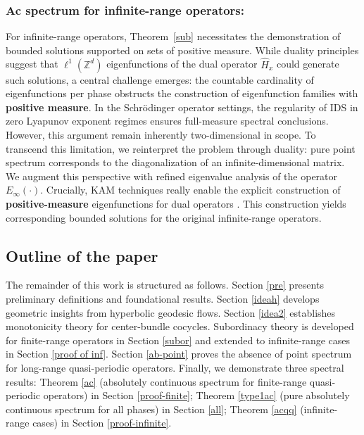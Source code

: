 \documentclass[11pt]{amsart}
\theoremstyle{remark}
\theoremstyle{definition}
\begin{document}
\subsubsection{Ac spectrum for infinite-range operators:}
For infinite-range operators, Theorem~\ref{sub} necessitates the demonstration of bounded solutions supported on sets of positive measure. While duality principles suggest that $\ell^1(\mathbb{Z}^d)$ eigenfunctions of the dual operator $\widehat{H}_x$ could generate such solutions, a central challenge emerges: the countable cardinality of eigenfunctions per phase obstructs the construction of eigenfunction families with \textbf{positive measure}.  
In the Schr\"odinger operator settings, the regularity of IDS in zero Lyapunov exponent regimes \cite{DeS, Puig1} ensures full-measure spectral conclusions. However, this argument remain inherently two-dimensional in scope. To transcend this limitation, we reinterpret the problem through duality: pure point spectrum corresponds to the diagonalization of an infinite-dimensional matrix. We augment this perspective with refined eigenvalue analysis of the operator \( E_\infty(\cdot ) \).  Crucially, KAM techniques really enable the explicit construction of \textbf{positive-measure} eigenfunctions for dual operators  \cite{E}. This construction yields corresponding bounded solutions for the original infinite-range operators. 



\subsection{Outline of the paper}
 

The remainder of this work is structured as follows. Section \ref{pre} presents preliminary definitions and foundational results. Section \ref{ideah} develops geometric insights from hyperbolic geodesic flows. Section \ref{idea2} establishes monotonicity theory for center-bundle cocycles. Subordinacy theory is developed for finite-range operators in Section \ref{subor} and extended to infinite-range cases in Section \ref{proof of inf}. Section \ref{ab-point} proves the absence of point spectrum for long-range quasi-periodic operators. Finally, we demonstrate three spectral results: Theorem \ref{ac} (absolutely continuous spectrum for finite-range quasi-periodic operators) in Section \ref{proof-finite};
Theorem \ref{type1ac} (pure absolutely continuous spectrum for all phases) in Section \ref{all};
 Theorem \ref{acqq} (infinite-range cases) in Section \ref{proof-infinite}.
\end{document}
